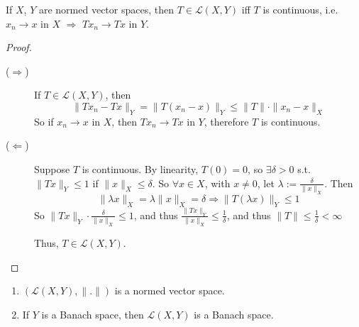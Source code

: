 \begin{thm}
    If $X$, $Y$ are normed vector spaces, then 
    $T \in \mathcal{L}(X, Y)$ iff $T$ is continuous, i.e. $x_n \to x$ in $X$ $\Rightarrow$ 
    $Tx_n \to Tx$ in $Y$.        
\end{thm}

\begin{proof} \leavevmode
    \begin{description}
        \item[($\Rightarrow$) ] If $T \in \mathcal{L}(X, Y)$, then 
        \[
            \| Tx_n - Tx \|_Y = \| T(x_n - x) \|_Y \leq \| T \| \cdot \| x_n - x \|_X  
        \] 
        So if $x_n \to x$ in $X$, then $Tx_n \to Tx$ in $Y$, therefore $T $ is continuous.
        
        \item[($\Leftarrow$)] Suppose $T$ is continuous. By linearity, $T(0) = 0$, so
        $\exists \delta > 0$ s.t. $\| Tx \|_Y \leq 1 $ if $\| x \|_X \leq \delta$.
        So $\forall x \in X$, with $x \neq 0$, let $\lambda := \frac{\delta}{\| x \|_X }$.
        Then 
        \[
        \| \lambda x \|_X = \lambda \| x \|_X = \delta  \Rightarrow \| T(\lambda x) \|_Y \leq 1 
        \]         
        So $\| Tx \|_Y \cdot \frac{\delta}{\| x \|_X } \leq 1$, and thus
        $\frac{\| Tx \|_Y }{\| x \|_X } \leq \frac{1}{\delta}$, and thus $\| T \| \leq 
        \frac{1}{\delta} < \infty $  
        
        Thus, $T \in \mathcal{L}(X, Y)$. \qedhere
    \end{description}
\end{proof}

\begin{prop}
    \begin{enumerate}
        \item $(\mathcal{L}(X, Y), \| . \|)$ is a normed vector space.
        \item If $Y$ is a Banach space, then $\mathcal{L}(X, Y)$ is a Banach space.
    \end{enumerate}
\end{prop}

